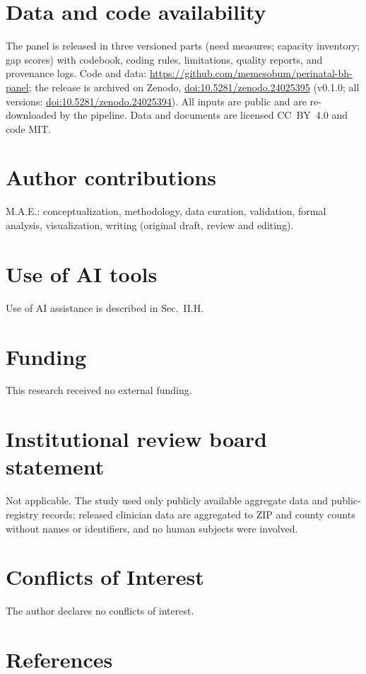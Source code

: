 \documentclass{article}
\begin{document}
\section*{Data and code availability}
The panel is released in three versioned parts (need measures; capacity inventory; gap scores) with codebook, coding rules, limitations, quality reports, and provenance logs. Code and data: \url{https://github.com/memesobum/perinatal-bh-panel}; the release is archived on Zenodo, \href{https://doi.org/10.5281/zenodo.24025395}{doi:10.5281/zenodo.24025395} (v0.1.0; all versions: \href{https://doi.org/10.5281/zenodo.24025394}{doi:10.5281/zenodo.24025394}). All inputs are public and are re-downloaded by the pipeline. Data and documents are licensed CC~BY~4.0 and code MIT.

\section*{Author contributions}
M.A.E.: conceptualization, methodology, data curation, validation, formal analysis, visualization, writing (original draft, review and editing).

\section*{Use of AI tools}
Use of AI assistance is described in Sec.~II.H.

\section*{Funding}
This research received no external funding.

\section*{Institutional review board statement}
Not applicable. The study used only publicly available aggregate data and public-registry records; released clinician data are aggregated to ZIP and county counts without names or identifiers, and no human subjects were involved.

\section*{Conflicts of Interest}
The author declares no conflicts of interest.

\section*{References}
\end{document}
